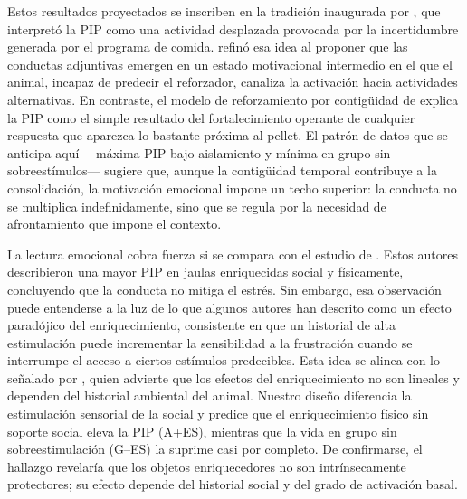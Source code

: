 \documentclass[12pt,a4paper]{article}
\begin{document}
\begin{multicols}{2}
Estos resultados proyectados se inscriben en la tradición inaugurada por \citet{Falk1961}, que interpretó la PIP como una actividad desplazada provocada por la incertidumbre generada por el programa de comida. \citet{Staddon1977} refinó esa idea al proponer que las conductas adjuntivas emergen en un estado motivacional intermedio en el que el animal, incapaz de predecir el reforzador, canaliza la activación hacia actividades alternativas. En contraste, el modelo de reforzamiento por contigüidad de \citet{Killeen2013} explica la PIP como el simple resultado del fortalecimiento operante de cualquier respuesta que aparezca lo bastante próxima al pellet. El patrón de datos que se anticipa aquí —máxima PIP bajo aislamiento y mínima en grupo sin sobreestímulos— sugiere que, aunque la contigüidad temporal contribuye a la consolidación, la motivación emocional impone un techo superior: la conducta no se multiplica indefinidamente, sino que se regula por la necesidad de afrontamiento que impone el contexto.

La lectura emocional cobra fuerza si se compara con el estudio de \citet{FuentesVerdugo2023}. Estos autores describieron una mayor PIP en jaulas enriquecidas social y físicamente, concluyendo que la conducta no mitiga el estrés. Sin embargo, esa observación puede entenderse a la luz de lo que algunos autores han descrito como un efecto paradójico del enriquecimiento, consistente en que un historial de alta estimulación puede incrementar la sensibilidad a la frustración cuando se interrumpe el acceso a ciertos estímulos predecibles. Esta idea se alinea con lo señalado por \citet{Wurbel2001}, quien advierte que los efectos del enriquecimiento no son lineales y dependen del historial ambiental del animal. Nuestro diseño diferencia la estimulación sensorial de la social y predice que el enriquecimiento físico sin soporte social eleva la PIP (A+ES), mientras que la vida en grupo sin sobreestimulación (G--ES) la suprime casi por completo. De confirmarse, el hallazgo revelaría que los objetos enriquecedores no son intrínsecamente protectores; su efecto depende del historial social y del grado de activación basal.


\end{multicols}
\end{document}
